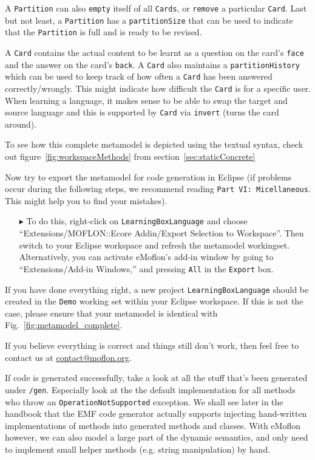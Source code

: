 A \texttt{Partition} can also \texttt{empty} itself of all \texttt{Cards}, or \texttt{remove} a particular \texttt{Card}.
Last but not least, a \texttt{Partition} has a \texttt{partitionSize} that can be used to indicate that the \texttt{Partition} is full and is ready to be revised.

A \texttt{Card} contains the actual content to be learnt as a question on the card's \texttt{face} and the answer on the card's \texttt{back}.
A \texttt{Card} also maintains a \texttt{partition\-History} which can be used to keep track of how often a \texttt{Card} has been answered correctly/wrongly.
This might indicate how difficult the \texttt{Card} is for a specific user.
When learning a language, it makes sense to be able to swap the target and source language and this is supported by \texttt{Card} via \texttt{invert} (turns the card around).

To see how this complete metamodel is depicted using the textual syntax, check out figure~\ref{fig:workspaceMethods} from section~\ref{sec:staticConcrete}

Now try to export the metamodel for code generation in Eclipse (if problems occur during the following steps, we recommend reading \texttt{Part VI: Micellaneous}. This might help you to find your mistakes).

\begin{enumerate}
\item[$\blacktriangleright$] To do this, right-click on \texttt{LearningBoxLanguage} and choose ``Extensions/MOFLON::Ecore Addin/Export Selection to Workspace''.
Then switch to your Eclipse work\-space and refresh the metamodel workingset. Alternatively, you can activate eMoflon's add-in window by going to ``Extensions/Add-in Windows,'' and pressing \texttt{All} in the \texttt{Export} box.
\end{enumerate}


If you have done everything right, a new project \texttt{LearningBoxLanguage} should be created in the \texttt{Demo} working set within your Eclipse workspace.
If this is not the case, please ensure that your metamodel is identical with Fig.~\ref{fig:metamodel_complete}.

If you believe everything is correct and things still don't work, then feel free to contact us at \href{mailto:contact@moflon.org}{contact@moflon.org}.

If code is generated successfully, take a look at all the stuff that's been generated under \texttt{/gen}. Especially look at the the default implementation for all methods who throw an  \texttt{OperationNotSupported} exception.
We shall see later in the handbook that the EMF code generator actually supports injecting hand-written implementations of methods into generated methods and classes.
With eMoflon however, we can also model a large part of the dynamic semantics, and only need to implement small helper methods (e.g. string manipulation) by hand.

